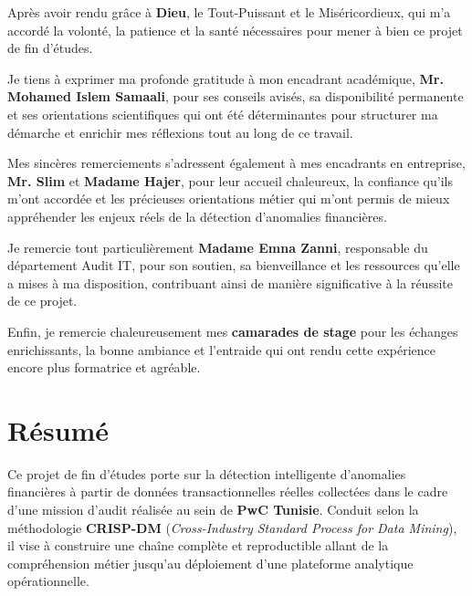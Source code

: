 \documentclass[12pt,a4paper,twoside]{report}
\begin{document}
Après avoir rendu grâce à \textbf{Dieu}, le Tout-Puissant et le Miséricordieux, qui m'a accordé la volonté, la patience et la santé nécessaires pour mener à bien ce projet de fin d'études.

\medskip

Je tiens à exprimer ma profonde gratitude à mon encadrant académique, \textbf{Mr. Mohamed Islem Samaali}, pour ses conseils avisés, sa disponibilité permanente et ses orientations scientifiques qui ont été déterminantes pour structurer ma démarche et enrichir mes réflexions tout au long de ce travail.

\medskip

Mes sincères remerciements s'adressent également à mes encadrants en entreprise, \textbf{Mr. Slim} et \textbf{Madame Hajer}, pour leur accueil chaleureux, la confiance qu'ils m'ont accordée et les précieuses orientations métier qui m'ont permis de mieux appréhender les enjeux réels de la détection d'anomalies financières.

\medskip

Je remercie tout particulièrement \textbf{Madame Emna Zanni}, responsable du département Audit IT, pour son soutien, sa bienveillance et les ressources qu'elle a mises à ma disposition, contribuant ainsi de manière significative à la réussite de ce projet.

\medskip

Enfin, je remercie chaleureusement mes \textbf{camarades de stage} pour les échanges enrichissants, la bonne ambiance et l'entraide qui ont rendu cette expérience encore plus formatrice et agréable.

\newpage

\chapter*{Résumé}

Ce projet de fin d'études porte sur la détection intelligente d'anomalies financières à partir de données transactionnelles réelles collectées dans le cadre d'une mission d'audit réalisée au sein de \textbf{PwC Tunisie}. Conduit selon la méthodologie \textbf{CRISP-DM} (\textit{Cross-Industry Standard Process for Data Mining}), il vise à construire une chaîne complète et reproductible allant de la compréhension métier jusqu'au déploiement d'une plateforme analytique opérationnelle.
\end{document}
